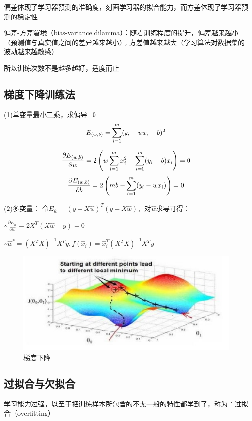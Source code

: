 \documentclass[supercite]{Experimental_Report}
\theoremstyle{definition}
\begin{document}
偏差体现了学习器预测的准确度，刻画学习器的拟合能力，而方差体现了学习器预测的稳定性

偏差-方差窘境（bias-variance dilamma）：随着训练程度的提升，偏差越来越小（预测值与真实值之间的差异越来越小）；方差值越来越大（学习算法对数据集的波动越来越敏感）

所以训练次数不是越多越好，适度而止
\subsection{梯度下降训练法}



(1)单变量最小二乘，求偏导=0
$$
E_{(w, b)}=\sum_{i=1}^{m}(y_{i}-w x_{i}-b)^2 \\
$$

$$
\frac{\partial E_{(w, b)}}{\partial w} =2\left(w \sum_{i=1}^m x_i^2-\sum_{i=1}^m (y_i-b) x_{i}\right) = 0 \\ 
$$
$$
\frac{\partial E_{(w, b)}}{\partial b} =2\left(m b-\sum_{i=1}^m (y_i-w x_i) \right) = 0 \\
$$

(2)多变量：
令$E_{\hat{w}}=(y-X\hat{w})^T (y-X\hat{w})$，对$\hat{w}$求导可得：  

$\displaystyle \therefore \frac{\partial E_{\hat{w}}}{\partial \hat{w}}=2 X^T(X \hat{w}-y) = 0$  

$\therefore \hat{w}^*=(X^T X )^{-1} X^T y, f(\hat{x}_i)=\hat{x}_i^T(X^T X)^{-1} X^T y$  

\begin{figure}[ht]
\centering
\includegraphics[scale=1.0]{image/gradient_descent.jpg}
\caption{梯度下降}
\label{fig:p1}
\end{figure}


\subsection{过拟合与欠拟合}
学习能力过强，以至于把训练样本所包含的不太一般的特性都学到了，称为：过拟合（overfitting）
\end{document}
